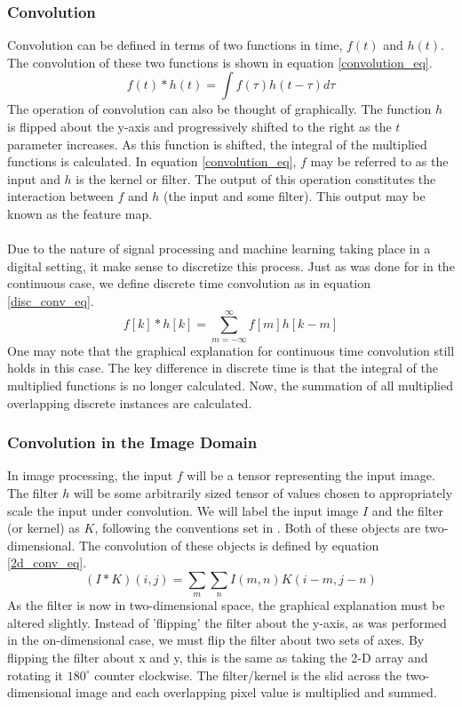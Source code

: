 \subsubsection{Convolution}
Convolution can be defined in terms of two functions in time, $f(t)$ and $h(t)$. The convolution of these two functions is shown in equation \ref{convolution_eq}.
\begin{equation}
    f(t) * h(t) = \int f(\tau)h(t-\tau) d\tau
    \label{convolution_eq}
\end{equation}
The operation of convolution can also be thought of graphically. The function $h$ is flipped about the y-axis and progressively shifted to the right as the $t$ parameter increases. As this function is shifted, the integral of the multiplied functions is calculated. In equation \ref{convolution_eq}, $f$ may be referred to as the input and $h$ is the kernel or filter. The output of this operation constitutes the interaction between $f$ and $h$ (the input and some filter). This output may be known as the feature map.\\ \\
Due to the nature of signal processing and machine learning taking place in a digital setting, it make sense to discretize this process. Just as was done for in the continuous case, we define discrete time convolution as in equation \ref{disc_conv_eq}.
\begin{equation}
    f[k]*h[k] = \sum^{\infty}_{m=-\infty} f[m]h[k-m]
    \label{disc_conv_eq}
\end{equation}
One may note that the graphical explanation for continuous time convolution still holds in this case. The key difference in discrete time is that the integral of the multiplied functions is no longer calculated. Now, the summation of all multiplied overlapping discrete instances are calculated. 

\subsubsection{Convolution in the Image Domain}
In image processing, the input $f$ will be a tensor representing the input image. The filter $h$ will be some arbitrarily sized tensor of values chosen to appropriately scale the input under convolution. We will label the input image $I$ and the filter (or kernel) as $K$, following the conventions set in \cite{Goodfellow-et-al-2016}. Both of these objects are two-dimensional. The convolution of these objects is defined by equation \ref{2d_conv_eq}.
\begin{equation}
    (I*K)(i, j) = \sum_m\sum_n I(m,n)K(i-m, j-n)
    \label{2d_conv_eq}
\end{equation}
As the filter is now in two-dimensional space, the graphical explanation must be altered slightly. Instead of 'flipping' the filter about the y-axis, as was performed in the on-dimensional case, we must flip the filter about two sets of axes. By flipping the filter about x and y, this is the same as taking the 2-D array and rotating it $180^\circ$ counter clockwise. The filter/kernel is the slid across the two-dimensional image and each overlapping pixel value is multiplied and summed.

